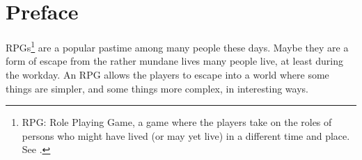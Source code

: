 
\chapter*{Preface}
%

RPGs\footnote{RPG: Role Playing Game, a game where the players take on
the roles of persons who might have lived (or may yet live) in a
different time and place.  See \cite{Gygax78,Gygax79}.} are a popular
pastime among many people these days.  Maybe they are a form of escape
from the rather mundane lives many people live, at least during the
workday.  An RPG allows the players to escape into a world where some
things are simpler, and some things more complex, in interesting
ways.

